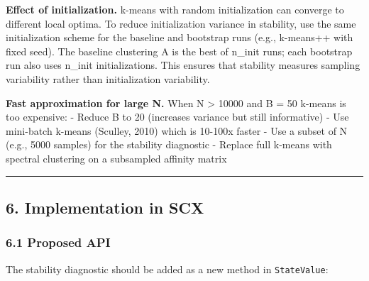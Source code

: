 \documentclass[
  12pt,
]{article}
\begin{document}
\textbf{Effect of initialization.} k-means with random initialization
can converge to different local optima. To reduce initialization
variance in stability, use the same initialization scheme for the
baseline and bootstrap runs (e.g., k-means++ with fixed seed). The
baseline clustering A is the best of n\_init runs; each bootstrap run
also uses n\_init initializations. This ensures that stability measures
sampling variability rather than initialization variability.

\textbf{Fast approximation for large N.} When N \textgreater{} 10000 and
B = 50 k-means is too expensive: - Reduce B to 20 (increases variance
but still informative) - Use mini-batch k-means (Sculley, 2010) which is
10-100x faster - Use a subset of N (e.g., 5000 samples) for the
stability diagnostic - Replace full k-means with spectral clustering on
a subsampled affinity matrix

\begin{center}\rule{0.5\linewidth}{0.5pt}\end{center}

\subsection{6. Implementation in SCX}\label{implementation-in-scx}

\subsubsection{6.1 Proposed API}\label{proposed-api}

The stability diagnostic should be added as a new method in
\texttt{StateValue}:
\end{document}
